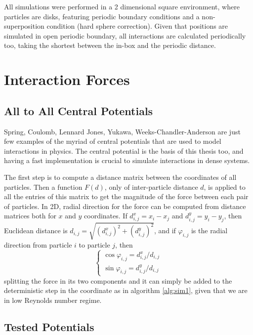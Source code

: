 \documentclass[../../master_thesis_np.tex]{subfiles}
\begin{document}
	All simulations were performed in a 2 dimensional square environment, where particles are disks, featuring periodic boundary conditions and a non-superposition condition (hard sphere correction). Given that positions are simulated in open periodic boundary, all interactions are calculated periodically too, taking the shortest between the in-box and the periodic distance.

	\section{Interaction Forces}
	
	\subsection{All to All Central Potentials}
	Spring, Coulomb, Lennard Jones, Yukawa, Weeks-Chandler-Anderson are just few examples of the myriad of central potentials that are used to model interactions in physics. The central potential is the basis of this thesis too, and having a fast implementation is crucial to simulate interactions in dense systems. 
	
	The first step is to compute a distance matrix between the coordinates of all particles. Then a function $F(d)$, only of inter-particle distance $d$, is applied to all the entries of this matrix to get the magnitude of the force between each pair of particles. In 2D, radial direction for the force can be computed from distance matrices both for $x$ and $y$ coordinates. If $d^x_{i,j} = x_i - x_j$ and $d^y_{i,j} = y_i - y_j$, then Euclidean distance is $d_{i,j} = \sqrt{(d^x_{i,j})^2 + (d^y_{i,j})^2}$, and if $\varphi_{i,j}$ is the radial direction from particle $i$ to particle $j$, then
	\begin{equation}
		\begin{cases}
			\cos\varphi_{i,j} = d^x_{i,j}/d_{i,j}\\
			\sin\varphi_{i,j} = d^y_{i,j}/d_{i,j}
		\end{cases}
	\end{equation}
	splitting the force in its two components and it can simply be added to the deterministic step in the coordinate as in algorithm \ref{alg:sim1}, given that we are in low Reynolds number regime. 
	
	\subsection{Tested Potentials}
	
\end{document}
